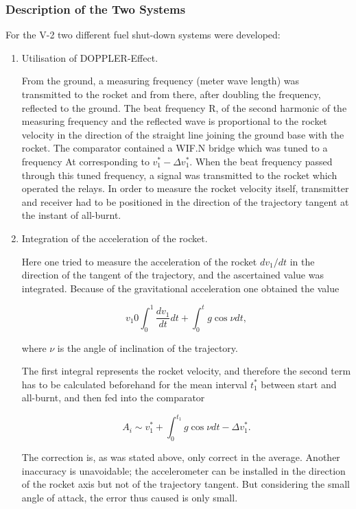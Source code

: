 \documentclass[12pt, a4paper]{article}
\begin{document}
\subsubsection*{Description of the Two Systems}

For the V-2 two different fuel shut-down systems were developed:

\begin{enumerate}
  \item Utilisation of DOPPLER-Effect.

  From the ground, a measuring frequency (meter wave length) was transmitted to the rocket and from there, after doubling the frequency, reflected to the ground. The beat frequency R, of the second harmonic of the measuring frequency and the reflected wave is proportional to the rocket velocity in the direction of the straight line joining the ground base with the rocket. The comparator contained a WIF.N bridge which was tuned to a frequency At corresponding to $v_{1}^{*}-\Delta v_{1}^{*}$. When the beat frequency passed through this tuned frequency, a signal was transmitted to the rocket which operated the relays. In order to measure the rocket velocity itself, transmitter and receiver had to be positioned in the direction of the trajectory tangent at the instant of all-burnt.

  \item Integration of the acceleration of the rocket.

Here one tried to measure the acceleration of the rocket $dv_{1}/ dt$ in the direction of the tangent of the trajectory, and the ascertained value was integrated. Because of the gravitational acceleration one obtained the value

\begin{equation}
  v_{1}0\int_{0}^{1}\frac{dv_{1}}{dt}dt+\int_{0}^{t}g\cos{\nu dt},
\end{equation}

where $\nu$ is the angle of inclination of the trajectory.

The first integral represents the rocket velocity, and therefore the second term has to be calculated beforehand for the mean interval $t_{1}^{*}$ between start and all-burnt, and then fed into the comparator

\begin{equation}
  A_{i}\sim v_{1}^{*}+\int_{0}^{t_{1}}g\cos{\nu dt}-\Delta v_{1}^{*}.
\end{equation}

The correction is, as was stated above, only correct in the average. Another inaccuracy is unavoidable; the accelerometer can be installed in the direction of the rocket axis but not of the trajectory tangent. But considering the small angle of attack, the error thus caused is only small.


\end{enumerate}
\end{document}
